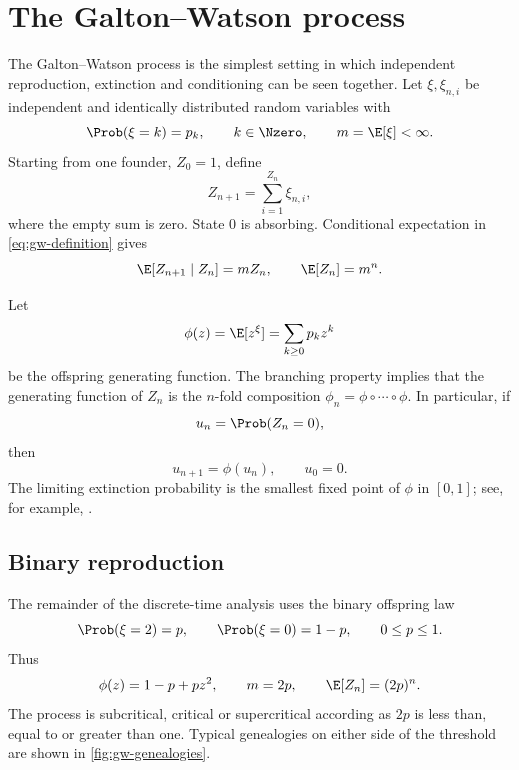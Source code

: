 \section{The Galton--Watson process}
\label{sec:galton-watson}

The Galton--Watson process is the simplest setting in which independent
reproduction, extinction and conditioning can be seen together.  Let
\(\xi,\xi_{n,i}\) be independent and identically distributed random variables with
\begin{equation}
  \Prob(\xi=k)=p_k,
  \qquad k\in\Nzero,
  \qquad
  m=\E[\xi]<\infty.
\end{equation}
Starting from one founder, \(Z_0=1\), define
\begin{equation}
  Z_{n+1}=\sum_{i=1}^{Z_n}\xi_{n,i},
  \label{eq:gw-definition}
\end{equation}
where the empty sum is zero.  State \(0\) is absorbing.  Conditional expectation in
\cref{eq:gw-definition} gives
\begin{equation}
  \E[Z_{n+1}\mid Z_n]=mZ_n,
  \qquad
  \E[Z_n]=m^n.
  \label{eq:gw-mean}
\end{equation}

Let
\begin{equation}
  \phi(z)=\E[z^\xi]=\sum_{k\geq0}p_kz^k
  \label{eq:offspring-pgf}
\end{equation}
be the offspring generating function.  The branching property implies that the
generating function of \(Z_n\) is the \(n\)-fold composition
\(\phi_n=\phi\circ\cdots\circ\phi\).  In particular, if
\begin{equation}
  u_n=\Prob(Z_n=0),
\end{equation}
then
\begin{equation}
  u_{n+1}=\phi(u_n),
  \qquad u_0=0.
  \label{eq:extinction-iteration}
\end{equation}
The limiting extinction probability is the smallest fixed point of \(\phi\) in
\([0,1]\); see, for example, \cite{Harris1963,AthreyaNey1972}.

\subsection{Binary reproduction}
\label{sec:binary-gw}

The remainder of the discrete-time analysis uses the binary offspring law
\begin{equation}
  \Prob(\xi=2)=p,
  \qquad
  \Prob(\xi=0)=1-p,
  \qquad 0\leq p\leq1.
  \label{eq:binary-law}
\end{equation}
Thus
\begin{equation}
  \phi(z)=1-p+pz^2,
  \qquad
  m=2p,
  \qquad
  \E[Z_n]=(2p)^n.
  \label{eq:binary-pgf-mean}
\end{equation}
The process is subcritical, critical or supercritical according as \(2p\) is less
than, equal to or greater than one.  Typical genealogies on either side of the
threshold are shown in \cref{fig:gw-genealogies}.

